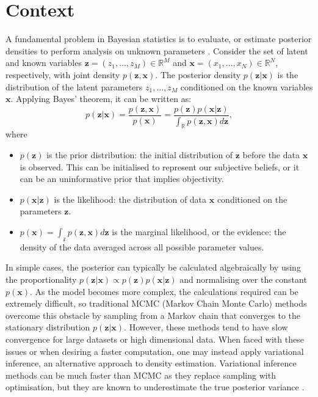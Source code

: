\documentclass[honours,12pt]{unswthesis}
\newcommand{\R}{\mathbb{R}}
\numberwithin{equation}{section}
\theoremstyle{definition}
\begin{document}
\section{Context}\label{sec:3.1}
A fundamental problem in Bayesian statistics is to evaluate, or estimate posterior densities to perform analysis on unknown parameters \citep{gelman}. Consider the set of latent and known variables $\bm{z}=(z_1,\dots,z_M)\in \R^M$ and $\bm{x}=(x_1,\dots,x_N)\in \R^N$, respectively, with joint density $p(\bm{z},\bm{x})$. The posterior density $p(\bm{z}|\bm{x})$ is the distribution of the latent parameters $z_1,\dots,z_M$ conditioned on the known variables $\bm{x}$. Applying Bayes' theorem, it can be written as:
\begin{equation*}
p(\bm{z}|\bm{x})=\frac{p(\bm{z},\bm{x})}{p(\bm{x})}= \frac{p(\bm{z})p(\bm{x}|\bm{z})}{\int_\R p(\bm{z},\bm{x})d\bm{z}},
\end{equation*}
where
\begin{itemize}
\item $p(\bm{z})$ is the prior distribution: the initial distribution of $\bm{z}$ before the data $\bm{x}$ is observed. This can be initialised to represent our subjective beliefs, or it can be an uninformative prior that implies objectivity.
\item $p(\bm{x}|\bm{z})$ is the likelihood: the distribution of data $\bm{x}$ conditioned on the parameters $\bm{z}$.
\item $p(\bm{x})=\int_\mathcal{z}p(\bm{z},\bm{x})d\bm{z}$ is the marginal likelihood, or the evidence: the density of the data averaged across all possible parameter values.
\end{itemize}
In simple cases, the posterior can typically be calculated algebraically by using the proportionality $p(\bm{z}|\bm{x})\propto p(\bm{z})p(\bm{x|z})$ and normalising over the constant $p(\bm{x})$. As the model becomes more complex, the calculations required can be extremely difficult, so
traditional MCMC (Markov Chain Monte Carlo) methods overcome this obstacle by sampling from a Markov chain that converges to the stationary distribution $p(\bm{z}|\bm{x})$. However, these methods tend to have slow convergence for large datasets or high dimensional data. When faced with these issues or when desiring a faster computation, one may instead apply variational inference, an alternative approach to density estimation. Variational inference methods can be much faster than MCMC as they replace sampling with optimisation, but they are known to underestimate the true posterior variance \citep{blei}.
\end{document}
